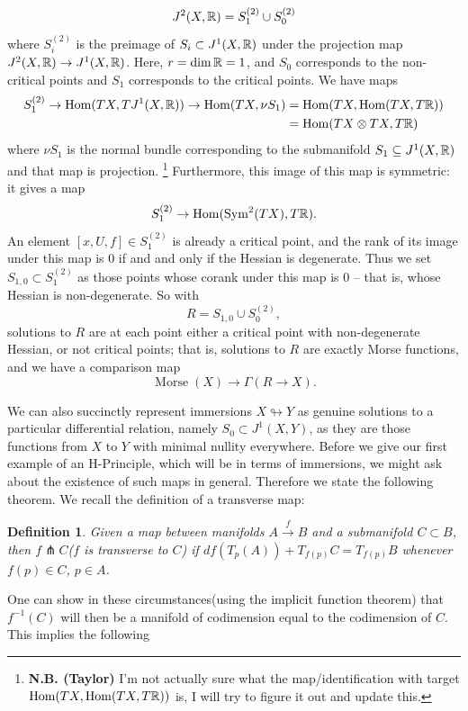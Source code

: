 \documentclass{article}
\newtheorem{definition}[theorem]{Definition}
\newtheorem{proposed work}[theorem]{Proposed Work}
\theoremstyle{definition}
\DeclareMathOperator{\Hom}{Hom}
\begin{document}
\[
  J^2(X,\mathbb R) = S_1^{(2)} \cup S_0^{(2)}
\]
where $S_i^{(2)}$ is the preimage of $S_i\subset J^1(X, \mathbb R)$ under the projection map $J^2(X, \mathbb R)\to J^1(X, \mathbb R)$. Here, $r= \dim\mathbb R = 1$, and $S_0$ corresponds to the non-critical points and $S_1$ corresponds to the critical points. We have maps
\begin{align*}
  S^{(2)}_1\to \Hom(TX, TJ^1(X, \R))\to \Hom(TX, \nu S_1) &= \Hom(TX,\Hom(TX,T\R))\\
                                                          &= \Hom(TX\otimes TX, T\R)
\end{align*}
where $\nu S_1$ is the normal bundle corresponding to the submanifold $S_1\subseteq J^1(X,\mathbb R)$ and that map is projection.
\footnote{\textbf{N.B. (Taylor)} I'm not actually sure what the map/identification with target $\Hom(TX, \Hom(TX,T\R))$ is, I will try to figure it out and update this.}
Furthermore, this image of this map is symmetric: it gives a map
\[
  S^{(2)}_1\to\Hom(\operatorname{Sym}^2(TX), T\R).
\]
An element $[x, U, f]\in S^{(2)}_1$ is already a critical point, and the rank of its image under this map is 0 if and and only if the Hessian is degenerate. Thus we set $S_{1,0}\subset S^{(2)}_1$ as those points whose corank under this map is $0$ -- that is, whose Hessian is non-degenerate. So with
\[
R = S_{1,0}\cup S_0^{(2)},
\]
solutions to $R$ are at each point either a critical point with non-degenerate Hessian, or not critical points; that is, solutions to $R$ are exactly Morse functions, and we have a comparison map
\[
  \operatorname{Morse}(X)\to \Gamma(R\to X).
\]


We can also succinctly represent immersions $X \looparrowright Y$ as genuine solutions to a particular differential relation, namely $S_0 \subset J^1(X,Y)$, as they are those functions from $X$ to $Y$ with minimal nullity everywhere. 
Before we give our first example of an H-Principle, which will be in terms of immersions, we might ask about the existence of such maps in general. Therefore we state the following theorem.  We recall the definition of a transverse map:

\begin{definition}\label{thm: transverse}
Given a map between manifolds $A \xrightarrow{f} B$ and a submanifold $C \subset B$, then $f \pitchfork C$($f$ is transverse to $C$) if $df(T_p(A))+T_{f(p)}C=T_{f(p)}B$ whenever $f(p) \in C$, $ p \in A$.
\end{definition}

One can show in these circumstances(using the implicit function theorem) that $f^{-1}(C)$ will then be a manifold of codimension equal to the codimension of $C$.  This implies the following
\end{document}
